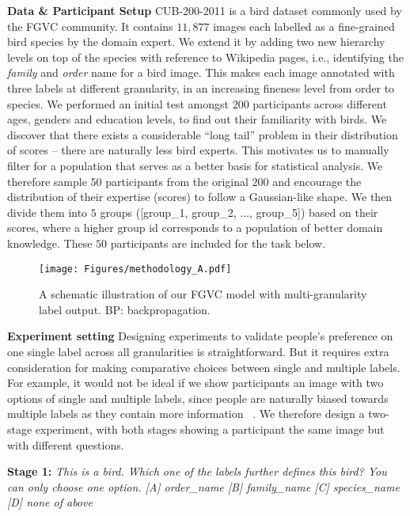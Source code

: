 \documentclass[final]{cvpr}
\newcommand{\keypoint}[1]{\vspace{0.05cm}\noindent\textbf{#1}\quad}
\begin{document}
\keypoint{Data \& Participant Setup} CUB-200-2011 is a bird dataset commonly used by the FGVC community. It contains $11, 877$ images each labelled as a fine-grained bird species by the domain expert. We extend it by adding two new  hierarchy levels  on top of the species with reference to Wikipedia pages, i.e., identifying the \textit{family} and \textit{order} name for a bird image. This makes each image annotated with three labels at different granularity, in an increasing fineness level from order to species. We performed an initial test amongst $200$ participants across different ages, genders and education levels, to find out their familiarity with birds. We discover that there exists a considerable ``long tail'' problem in their distribution of scores -- there are naturally less bird experts. This motivates us to manually filter for a population that serves as a better basis for statistical analysis. We therefore sample $50$ participants from the original $200$ and encourage the distribution of their expertise (scores) to follow a Gaussian-like shape. We then divide them into $5$ groups ([group\_1, group\_2, ..., group\_5]) based on their scores, where a higher group id corresponds to a population of better domain knowledge. These $50$ participants are included for the task below.


\begin{figure*}[t]
\begin{center}
\texttt{[image: Figures/methodology\_A.pdf]}
\end{center}

  \caption{A schematic illustration of our FGVC model with multi-granularity label output.  BP: backpropagation. }

\label{fig:Method}
\end{figure*}



\keypoint{Experiment setting} Designing experiments to validate people's preference on one single label across all granularities is straightforward. But it requires extra consideration for making comparative choices between single and multiple labels. For example, it would not be ideal if we show participants an image with two options of single and multiple labels, since people are naturally biased towards multiple labels as they contain more information ~\cite{thabane2010tutorial}. We therefore design a two-stage experiment, with both stages showing a participant the same image but with different questions.

\noindent\textbf{Stage 1:} \textit{This is a bird. Which one of the labels further defines this bird? You can only choose one option. [A] order\_name [B] family\_name [C] species\_name [D] none of above}
\end{document}
